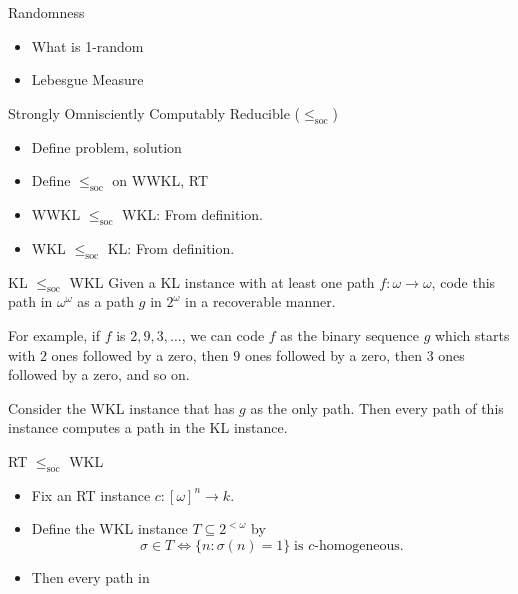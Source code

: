 \begin{frame}{Randomness}
  \begin{itemize}
    \item What is 1-random
    \item Lebesgue Measure
  \end{itemize}
\end{frame}

\begin{frame}{Strongly Omnisciently Computably Reducible
  ($\leq_{\text{soc}}$)}
  \begin{itemize}
    \item Define problem, solution
    \item Define $\leq_{\text{soc}}$ on WWKL, RT
    \item WWKL $\leq_{\text{soc}}$ WKL: From definition.
    \item WKL $\leq_{\text{soc}}$ KL: From definition.
  \end{itemize}
\end{frame}

\begin{frame}{KL $\leq_{\text{soc}}$ WKL}
  Given a KL instance with at least one path $f:\omega\rightarrow\omega$,
  code this path in $\omega^\omega$ as a path $g$ in $2^\omega$ in a
  recoverable manner.

  \vspace{2em}
  For example, if $f$ is $2,9,3,\ldots$, we can code $f$ as the binary
  sequence $g$ which starts with $2$ ones followed by a zero, then $9$ ones
  followed by a zero, then $3$ ones followed by a zero, and so on.

  \vspace{2em}
  Consider the WKL instance that has $g$ as the only path. Then every
  path of this instance computes a path in the KL instance.
\end{frame}

\begin{frame}{RT $\leq_{\text{soc}}$ WKL}
  \begin{itemize}
    \item Fix an RT instance $c:[\omega]^n\rightarrow k$.
    \item Define the WKL instance $T\subseteq 2^{<\omega}$ by
      \[\sigma\in T \Leftrightarrow \{n:\sigma(n)=1\}\; \text{is
      $c$-homogeneous}.\]
    \item Then every path in 
  \end{itemize}
\end{frame}

